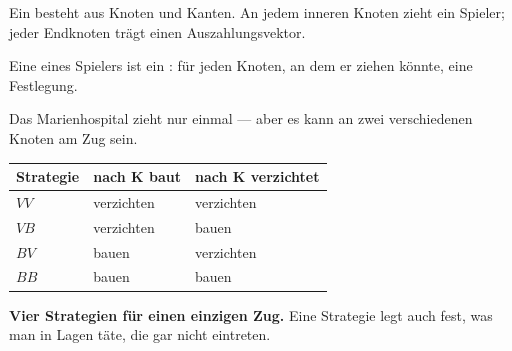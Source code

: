 \begin{definition}
Ein  besteht aus Knoten und Kanten. An jedem inneren Knoten zieht ein Spieler; jeder Endknoten trägt einen Auszahlungsvektor.

Eine  eines Spielers ist ein : für jeden Knoten, an dem er ziehen könnte, eine Festlegung.
\end{definition}

\begin{merksatz}
Das Marienhospital zieht nur einmal --- aber es kann an zwei verschiedenen Knoten am Zug sein.

\begin{center}
{\small
\renewcommand{\arraystretch}{1.5}
\begin{tabular}{@{}P{2.2cm}P{2.6cm}P{2.8cm}@{}}
\toprule
\textbf{Strategie} & \textbf{nach K baut} & \textbf{nach K verzichtet}\\
\midrule
$VV$ & verzichten & verzichten\\
$VB$ & verzichten & bauen\\
$BV$ & bauen & verzichten\\
$BB$ & bauen & bauen\\
\bottomrule
\end{tabular}}
\end{center}

\begin{center}
\begin{minipage}{0.9\textwidth}
\textbf{Vier Strategien für einen einzigen Zug.} Eine Strategie legt auch fest, was man in Lagen täte, die gar nicht eintreten.
\end{minipage}
\end{center}

\begin{center}
\begin{minipage}{0.88\textwidth}
\end{minipage}
\end{center}
\end{merksatz}

